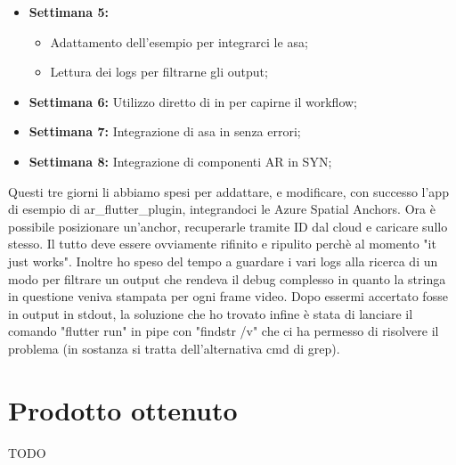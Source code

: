 \begin{itemize}
\begin{itemize}
        \end{itemize}
    \item \textbf{Settimana 5:} 
        \begin{itemize}
            \item Adattamento dell'esempio \arplug per integrarci le asa;
            \item Lettura dei logs per filtrarne gli output;
        \end{itemize}
    \item \textbf{Settimana 6:} Utilizzo diretto di \arcore in \flutter per capirne il workflow;
    \item \textbf{Settimana 7:} Integrazione di asa in \flutter senza errori;
    \item \textbf{Settimana 8:} Integrazione di componenti AR in SYN;
\end{itemize}
Questi tre giorni li abbiamo spesi per addattare, e modificare, con successo l'app di esempio di ar_flutter_plugin, integrandoci le Azure Spatial Anchors.
Ora è possibile posizionare un'anchor, recuperarle tramite ID dal cloud e caricare sullo stesso. Il tutto deve essere ovviamente rifinito e ripulito perchè al momento "it just works".
Inoltre ho speso del tempo a guardare i vari logs alla ricerca di un modo per filtrare un output che rendeva il debug complesso in quanto la stringa in questione veniva stampata per ogni frame video.
Dopo essermi accertato fosse in output in stdout, la soluzione che ho trovato infine è stata di lanciare il comando "flutter run" in pipe con "findstr /v" che ci ha permesso di risolvere il problema (in sostanza si tratta dell'alternativa cmd di grep).
\section{Prodotto ottenuto}
TODO

